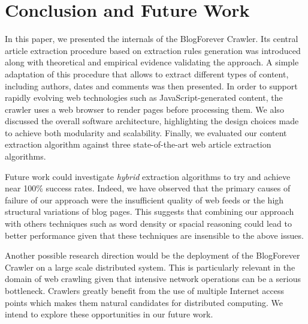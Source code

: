 \section{Conclusion and Future Work}
\label{conclusionandfuturework}

In this paper, we presented the internals of the BlogForever Crawler. Its central article extraction procedure based on extraction rules generation was introduced along with theoretical and empirical evidence validating the approach. A simple adaptation of this procedure that allows to extract different types of content, including authors, dates and comments was then presented. In order to support rapidly evolving web technologies such as JavaScript-generated content, the crawler uses a web browser to render pages before processing them. We also discussed the overall software architecture, highlighting the design choices made to achieve both modularity and scalability. Finally, we evaluated our content extraction algorithm against three state-of-the-art web article extraction algorithms.


Future work could investigate \emph{hybrid} extraction algorithms to try and achieve near 100\% success rates. Indeed, we have observed that the primary causes of failure of our approach were the insufficient quality of web feeds or the high structural variations of blog pages. This suggests that combining our approach with others techniques such as word density or spacial reasoning could lead to better performance given that these techniques are insensible to the above issues.

Another possible research direction would be the deployment of the BlogForever Crawler on a large scale distributed system. This is particularly relevant in the domain of web crawling given that intensive network operations can be a serious bottleneck. Crawlers greatly benefit from the use of multiple Internet access points which makes them natural candidates for distributed computing. We intend to explore these opportunities in our future work.
